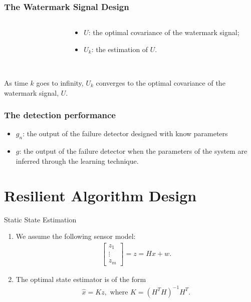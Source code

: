 \documentclass[10pt]{beamer}
\newcommand{\tikzdir}[1]{#1.tikz}
\newcommand{\inputtikz}[1]{}}
\begin{document}
\begin{frame}
  \frametitle{The Watermark Signal Design}
  \begin{columns}
    \begin{column}{0.6\textwidth}
      \begin{figure}[h!]
        \inputtikz{errU1_te}
      \end{figure}
    \end{column}
    \begin{column}{0.4\textwidth}
      \begin{itemize}
      \item $U$: the optimal covariance of the watermark signal;
      \item $U_k$: the estimation of $U$.
      \end{itemize}
    \end{column}
  \end{columns}
  ~\\
  As time $k$ goes to infinity, $U_k$ converges to the optimal covariance of the watermark signal, $U$.
\end{frame}

\begin{frame}
  \frametitle{The detection performance}
  \begin{itemize}
  \item $g_n$: the output of the failure detector designed with know parameters
  \item $g$: the output of the failure detector when the parameters of the system are inferred through the learning technique. 
  \end{itemize}
  \begin{figure}[h!]
    \centering
    \inputtikz{gng_te}
  \end{figure}
\end{frame}

\section{Resilient Algorithm Design}

\begin{frame}{Static State Estimation}
  \begin{enumerate}
  \item We assume the following sensor model:
    \begin{align*}
  \begin{bmatrix}z_1\\\vdots\\z_m\end{bmatrix} =  z = Hx + w.
    \end{align*}
  \item The optimal state estimator is of the form
    \begin{align*}
      \hat x = Kz, \text{ where }K = (H^TH)^{-1}H^T.
    \end{align*}
  \end{enumerate}
\end{frame}
\end{document}
